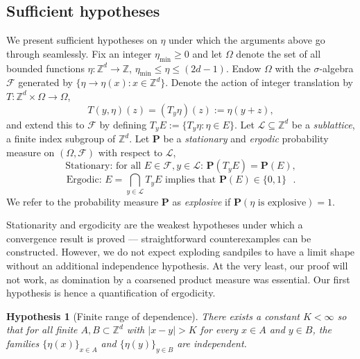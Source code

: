 \documentclass[aap]{imsart}
\newcommand{\Z}{\mathbb{Z}}
\newtheorem{hyp}{Hypothesis}
\begin{document}
\subsection{Sufficient hypotheses} \label{sec:sufficient_hypotheses}
We present sufficient hypotheses on $\eta$ under which the arguments above go through seamlessly. 
Fix an integer $\eta_{\min} \geq 0$ and let $\Omega$ denote the set of all bounded functions $\eta: \Z^d \to \Z$, $\eta_{\min} \leq \eta \leq (2 d- 1)$.
Endow $\Omega$ with the $\sigma$-algebra $\mathcal{F}$ generated by $\{ \eta \to \eta(x) : x \in \Z^d\}$. Denote the action of integer translation by $T: \Z^d \times \Omega \to \Omega$, 
\[
T(y, \eta)(z) = (T_y \eta)(z) := \eta(y + z),
\]
and extend this to $\mathcal{F}$ by defining  $T_y E := \{ T_y \eta : \eta \in E\}$.
Let $\mathcal{L} \subseteq \Z^d$ be a {\it sublattice}, a finite index subgroup of $\Z^d$.
Let $\mathbf{P}$ be a {\it stationary} and {\it ergodic} probability measure on $(\Omega, \mathcal{F})$
with respect to $\mathcal{L}$,
\begin{equation}
\mbox{Stationary: for all $E \in \mathcal{F}, y \in \mathcal{L}$: } \mathbf{P}(T_y E) = \mathbf{P}(E),
\end{equation}
\begin{equation}
\mbox{Ergodic:  $E = \bigcap_{y \in \mathcal{L}} T_y E$ implies that $\mathbf{P}(E) \in \{0,1\}$ }.
\end{equation}
We refer to the probability measure $\mathbf{P}$ as {\it explosive} if $\mathbf{P}(\eta \mbox{ is explosive}) = 1$.

Stationarity and ergodicity are the weakest hypotheses under which a convergence result is proved --- straightforward 
counterexamples can be constructed.
However, we do not expect exploding sandpiles to have a limit shape without an additional independence hypothesis. At the very least, 
our proof will not work, as domination by a coarsened product measure was essential. Our first hypothesis is hence a quantification of ergodicity. 

\begin{hyp}[Finite range of dependence] \label{hyp:finite_range_of_dependence}
	There exists a constant $K < \infty$ so that for all finite $A, B \subset \Z^d$ with $|x-y| > K$ for every $x \in A$ and $y \in B$, the families $\{\eta(x)\}_{x \in A}$ and $\{\eta(y)\}_{y \in B}$ are independent. 
\end{hyp}
\end{document}
